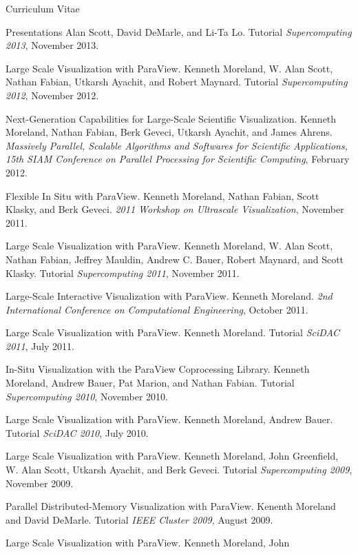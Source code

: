\documentclass{article}
\begin{document}
\begin{cv}{Curriculum Vitae}
\begin{cvlist}{Presentations}
      Alan Scott, David DeMarle, and Li-Ta Lo. Tutorial
      \emph{Supercomputing 2013}, November 2013.
    \item[Large Scale Visualization with ParaView.] Kenneth Moreland,
      W. Alan Scott, Nathan Fabian, Utkarsh Ayachit, and Robert
      Maynard. Tutorial \emph{Supercomputing 2012}, November 2012.
    \item[Next-Generation Capabilities for Large-Scale Scientific
      Visualization.] Kenneth Moreland, Nathan Fabian, Berk Geveci, Utkarsh
      Ayachit, and James Ahrens. \emph{Massively Parallel, Scalable
        Algorithms and Softwares for Scientific Applications, 15th SIAM
        Conference on Parallel Processing for Scientific Computing},
      February 2012.
    \item[Flexible In Situ with ParaView.] Kenneth Moreland, Nathan Fabian,
      Scott Klasky, and Berk Geveci. \emph{2011 Workshop on Ultrascale
        Visualization}, November 2011.
    \item[Large Scale Visualization with ParaView.] Kenneth Moreland,
      W. Alan Scott, Nathan Fabian, Jeffrey Mauldin, Andrew C. Bauer,
      Robert Maynard, and Scott Klasky. Tutorial \emph{Supercomputing
        2011}, November 2011.
    \item[Large-Scale Interactive Visualization with ParaView.] Kenneth
      Moreland. \emph{2nd International Conference on Computational
        Engineering}, October 2011.
    \item[Large Scale Visualization with ParaView.] Kenneth
      Moreland. Tutorial \emph{SciDAC 2011}, July 2011.
    \item[In-Situ Visualization with the ParaView Coprocessing Library.]
      Kenneth Moreland, Andrew Bauer, Pat Marion, and Nathan
      Fabian. Tutorial \emph{Supercomputing 2010}, November 2010.
    \item[Large Scale Visualization with ParaView.] Kenneth Moreland,
      Andrew Bauer. Tutorial \emph{SciDAC 2010}, July 2010.
    \item[Large Scale Visualization with ParaView.] Kenneth Moreland, John
      Greenfield, W. Alan Scott, Utkarsh Ayachit, and Berk Geveci. Tutorial
      \emph{Supercomputing 2009}, November 2009.
    \item[Parallel Distributed-Memory Visualization with ParaView.] Kenenth
      Moreland and David DeMarle. Tutorial \emph{IEEE Cluster 2009}, August
      2009.
    \item[Large Scale Visualization with ParaView.] Kenneth Moreland, John

\end{cvlist}
\end{cv}
\end{document}
